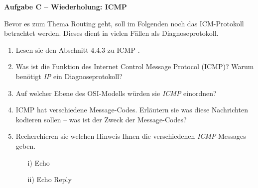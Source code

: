 \documentclass[paper=a4,fontsize=11pt]{scrartcl}%
\numberwithin{equation}{section}
\begin{document}
\begin{center}\Large{\textbf{Aufgabe C -- Wiederholung: ICMP}}\end{center}\vskip0.2in
Bevor es zum Thema Routing geht, soll im Folgenden noch das ICM-Protokoll betrachtet werden. Dieses dient in vielen Fällen als Diagnoseprotokoll.
\begin{enumerate}
	\item Lesen sie den Abschnitt 4.4.3 zu ICMP \cite[S. 353]{Kurose2012}.
	\item Was ist die Funktion des Internet Control Message Protocol (ICMP)? Warum benötigt \emph{IP} ein Diagnoseprotokoll?
	\item Auf welcher Ebene des OSI-Modells würden sie \emph{ICMP} einordnen?
	\item ICMP hat verschiedene Message-Codes. Erläutern sie was diese Nachrichten kodieren sollen -- was ist der Zweck der Message-Codes?
	\item Recherchieren sie welchen Hinweis Ihnen die verschiedenen \emph{ICMP}-Messages geben.
		\begin{itemize}
			\item[i)] Echo
			\item[ii)] Echo Reply
		\end{itemize}
\end{enumerate}
\end{document}
